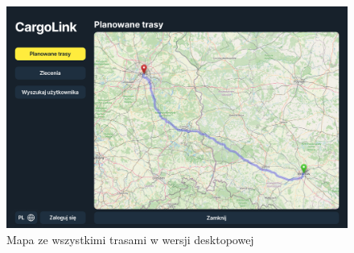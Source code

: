 \begin{figure}[H]
	\centering
		\includegraphics[width=0.7\linewidth]{rozdzial1/mapa_d.jpg}
	\caption{Mapa ze wszystkimi trasami w wersji desktopowej}
	\label{Rys. fig:Mapa ze wszystkimi trasami - desktop}
\end{figure}

